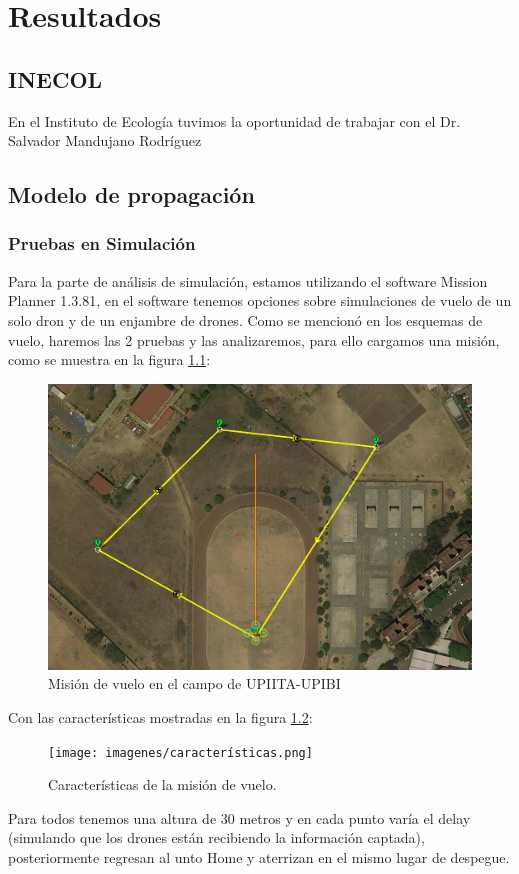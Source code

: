 \chapter{Resultados}
\section{INECOL}
En el Instituto de Ecología tuvimos la oportunidad de trabajar con el Dr. Salvador Mandujano Rodríguez
\newpage
\section{Modelo de propagación}
\newpage
\subsection{Pruebas en Simulación}
Para la parte de análisis de simulación, estamos utilizando el software Mission Planner 1.3.81, en el software tenemos opciones sobre simulaciones de vuelo de un solo dron y de un enjambre de drones. Como se mencionó en los esquemas de vuelo, haremos las 2 pruebas y las analizaremos, para ello cargamos una misión, como se muestra en la figura \ref{fig:mision-vuelo}:

\begin{figure}[h]
    \centering
    \includegraphics[width=0.7\linewidth]{imagenes/prueba_vuelo.png}
    \caption{Misión de vuelo en el campo de UPIITA-UPIBI}
    \label{fig:mision-vuelo}
\end{figure}
\newpage
Con las características mostradas en la figura \ref{fig:Características-vuelo}:
\begin{figure}[h]
    \centering
    \texttt{[image: imagenes/características.png]}
    \caption{Características de la misión de vuelo.}
    \label{fig:Características-vuelo}
\end{figure}

Para todos tenemos una altura de 30 metros y en cada punto varía el \textquotedbl{}delay\textquotedbl{} (simulando que los drones están recibiendo la información captada), posteriormente regresan al unto \textquotedbl{}Home\textquotedbl{} y aterrizan en el mismo lugar de despegue.

